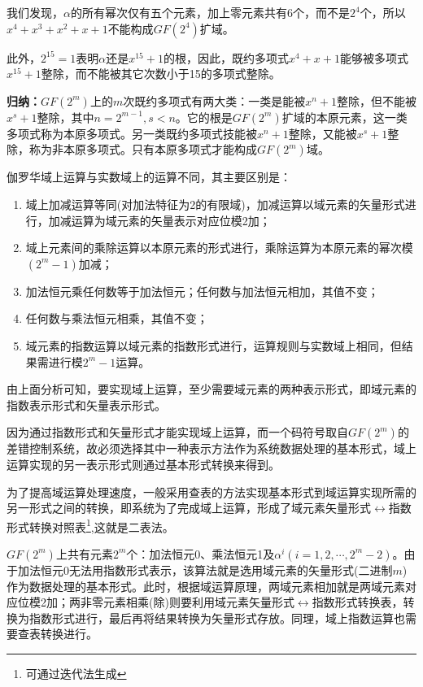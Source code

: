 我们发现，$\alpha$的所有幂次仅有五个元素，加上零元素共有6个，而不是$2^4$个，所以$x^4+x^3+x^2+x+1$不能构成$GF(2^4)$扩域。

此外，$2^{15}=1$表明$\alpha$还是$x^{15}+1$的根，因此，既约多项式$x^4+x+1$能够被多项式$x^{15}+1$整除，而不能被其它次数小于15的多项式整除。

\textbf{归纳：}$GF(2^m)$上的$m$次既约多项式有两大类：一类是能被$x^n+1$整除，但不能被$x^s+1$整除，其中$n=2^{m-1},s<n$。它的根是$GF(2^m)$扩域的本原元素，这一类多项式称为本原多项式。另一类既约多项式技能被$x^n+1$整除，又能被$x^s+1$整除，称为非本原多项式。只有本原多项式才能构成$GF(2^m)$域。

伽罗华域上运算与实数域上的运算不同，其主要区别\cite{XiangXi_GF}是：
\begin{enumerate}
  \item
    域上加减运算等同(对加法特征为2的有限域)，加减运算以域元素的矢量形式进行，加减运算为域元素的矢量表示对应位模2加；
  \item
    域上元素间的乘除运算以本原元素的形式进行，乘除运算为本原元素的幂次模$(2^m-1)$加减；
  \item 加法恒元乘任何数等于加法恒元；任何数与加法恒元相加，其值不变；
  \item 任何数与乘法恒元相乘，其值不变；
  \item
    域元素的指数运算以域元素的指数形式进行，运算规则与实数域上相同，但结果需进行模$2^m-1$运算。
\end{enumerate}
由上面分析可知，要实现域上运算，至少需要域元素的两种表示形式，即域元素的指数表示形式和矢量表示形式。

因为通过指数形式和矢量形式才能实现域上运算，而一个码符号取自$GF(2^m)$的差错控制系统，故必须选择其中一种表示方法作为系统数据处理的基本形式，域上运算实现的另一表示形式则通过基本形式转换来得到。

为了提高域运算处理速度，一般采用查表的方法实现基本形式到域运算实现所需的另一形式之间的转换，即系统为了完成域上运算，形成了域元素矢量形式$\leftrightarrow$指数形式转换对照表\footnote{可通过迭代法生成},这就是二表法。

$GF(2^m)$上共有元素$2^m$个：加法恒元0、乘法恒元1及$\alpha^i
(i=1,2,\cdots
,2^m-2)$。由于加法恒元0无法用指数形式表示，该算法就是选用域元素的矢量形式(二进制$m$)作为数据处理的基本形式。此时，根据域运算原理，两域元素相加就是两域元素对应位模2加；两非零元素相乘(除)则要利用域元素矢量形式$\leftrightarrow$指数形式转换表，转换为指数形式进行，最后再将结果转换为矢量形式存放。同理，域上指数运算也需要查表转换进行。
